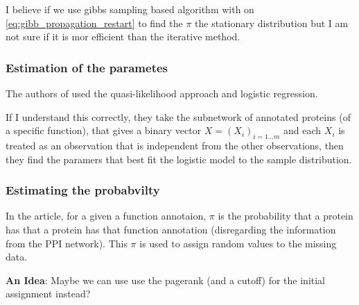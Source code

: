 \documentclass[a4paper,10pt]{article}
\theoremstyle{definition}
\theoremstyle{remark}
\theoremstyle{plain}
\begin{document}
I believe if we use gibbs sampling based algorithm with on \eqref{eq:gibb_propagation_restart}
to find the $\pi$ the stationary distribution but I am not sure if it is 
mor efficient than the iterative method. 

\subsubsection{Estimation of the parametes}
The authors of \textcite{deng2002prediction} used the quasi-likelihood
approach and logistic regression.

If I understand this correctly, they take the subnetwork of annotated proteins
(of a specific function), that gives a binary vector $X = (X_i)_{i=1 \dots m}$
and each $X_i$ is treated as an observation that is independent from the other
observations, then they find the paramers that best fit the logistic model to
the sample distribution.


\subsubsection{Estimating the probabvilty}
In the article, for a given a function annotaion, 
$\pi$ is the probability that a protein has that  
a protein has that function annotation (disregarding the information
from the PPI network). This $\pi$ is used to assign random values to the missing
data.

\textbf{An Idea}: Maybe we can use use the pagerank (and a cutoff) for the
initial assignment instead?

%
\end{document}
